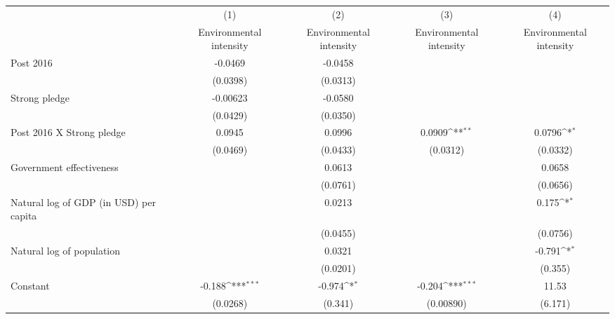{
\def\sym#1{\ifmmode^{#1}\else\(^{#1}\)\fi}
\begin{tabular}{l*{4}{c}}
\hline\hline
                    &\multicolumn{1}{c}{(1)}&\multicolumn{1}{c}{(2)}&\multicolumn{1}{c}{(3)}&\multicolumn{1}{c}{(4)}\\
                    &\multicolumn{1}{c}{Environmental intensity}&\multicolumn{1}{c}{Environmental intensity}&\multicolumn{1}{c}{Environmental intensity}&\multicolumn{1}{c}{Environmental intensity}\\
\hline
Post 2016           &     -0.0469         &     -0.0458         &                     &                     \\
                    &    (0.0398)         &    (0.0313)         &                     &                     \\
[1em]
Strong pledge       &    -0.00623         &     -0.0580         &                     &                     \\
                    &    (0.0429)         &    (0.0350)         &                     &                     \\
[1em]
Post 2016 X Strong pledge&      0.0945         &      0.0996         &      0.0909\sym{**} &      0.0796\sym{*}  \\
                    &    (0.0469)         &    (0.0433)         &    (0.0312)         &    (0.0332)         \\
[1em]
Government effectiveness&                     &      0.0613         &                     &      0.0658         \\
                    &                     &    (0.0761)         &                     &    (0.0656)         \\
[1em]
Natural log of GDP (in USD) per capita&                     &      0.0213         &                     &       0.175\sym{*}  \\
                    &                     &    (0.0455)         &                     &    (0.0756)         \\
[1em]
Natural log of population&                     &      0.0321         &                     &      -0.791\sym{*}  \\
                    &                     &    (0.0201)         &                     &     (0.355)         \\
[1em]
Constant            &      -0.188\sym{***}&      -0.974\sym{*}  &      -0.204\sym{***}&       11.53         \\
                    &    (0.0268)         &     (0.341)         &   (0.00890)         &     (6.171)         \\

\end{tabular}}
